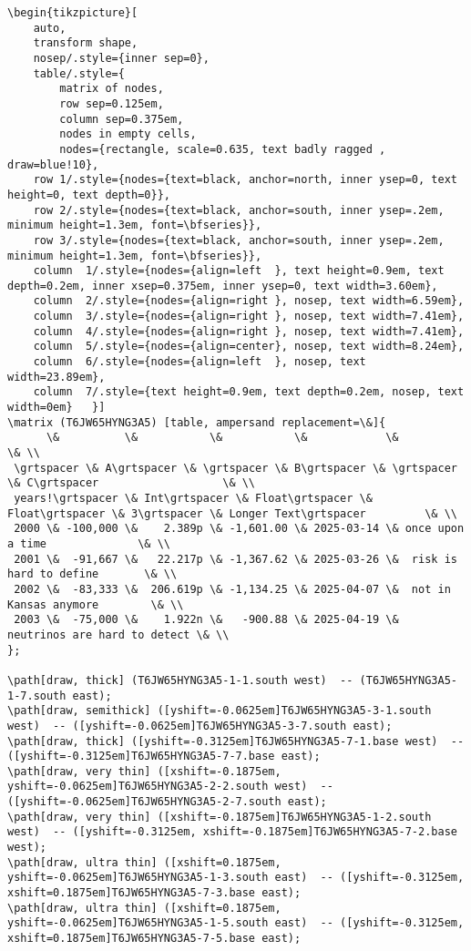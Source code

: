 \documentclass[
  11pt,
  a4paper,
  DIV=11,
  numbers=noendperiod]{scrartcl}
\newcommand{\grtspacer}{\vphantom{lp}}
\begin{document}
\begin{verbatim}
\begin{tikzpicture}[
    auto,
    transform shape,
    nosep/.style={inner sep=0},
    table/.style={
        matrix of nodes,
        row sep=0.125em,
        column sep=0.375em,
        nodes in empty cells,
        nodes={rectangle, scale=0.635, text badly ragged , draw=blue!10},
    row 1/.style={nodes={text=black, anchor=north, inner ysep=0, text height=0, text depth=0}},
    row 2/.style={nodes={text=black, anchor=south, inner ysep=.2em, minimum height=1.3em, font=\bfseries}},
    row 3/.style={nodes={text=black, anchor=south, inner ysep=.2em, minimum height=1.3em, font=\bfseries}},
    column  1/.style={nodes={align=left  }, text height=0.9em, text depth=0.2em, inner xsep=0.375em, inner ysep=0, text width=3.60em},
    column  2/.style={nodes={align=right }, nosep, text width=6.59em},
    column  3/.style={nodes={align=right }, nosep, text width=7.41em},
    column  4/.style={nodes={align=right }, nosep, text width=7.41em},
    column  5/.style={nodes={align=center}, nosep, text width=8.24em},
    column  6/.style={nodes={align=left  }, nosep, text width=23.89em},
    column  7/.style={text height=0.9em, text depth=0.2em, nosep, text width=0em}   }]
\matrix (T6JW65HYNG3A5) [table, ampersand replacement=\&]{
      \&          \&           \&           \&            \&                               \& \\
 \grtspacer \& A\grtspacer \& \grtspacer \& B\grtspacer \& \grtspacer \& C\grtspacer                   \& \\
 years!\grtspacer \& Int\grtspacer \& Float\grtspacer \& Float\grtspacer \& 3\grtspacer \& Longer Text\grtspacer         \& \\
 2000 \& -100,000 \&    2.389p \& -1,601.00 \& 2025-03-14 \& once upon a time              \& \\
 2001 \&  -91,667 \&   22.217p \& -1,367.62 \& 2025-03-26 \&  risk is hard to define       \& \\
 2002 \&  -83,333 \&  206.619p \& -1,134.25 \& 2025-04-07 \&  not in Kansas anymore        \& \\
 2003 \&  -75,000 \&    1.922n \&   -900.88 \& 2025-04-19 \&  neutrinos are hard to detect \& \\
};

\path[draw, thick] (T6JW65HYNG3A5-1-1.south west)  -- (T6JW65HYNG3A5-1-7.south east);
\path[draw, semithick] ([yshift=-0.0625em]T6JW65HYNG3A5-3-1.south west)  -- ([yshift=-0.0625em]T6JW65HYNG3A5-3-7.south east);
\path[draw, thick] ([yshift=-0.3125em]T6JW65HYNG3A5-7-1.base west)  -- ([yshift=-0.3125em]T6JW65HYNG3A5-7-7.base east);
\path[draw, very thin] ([xshift=-0.1875em, yshift=-0.0625em]T6JW65HYNG3A5-2-2.south west)  -- ([yshift=-0.0625em]T6JW65HYNG3A5-2-7.south east);
\path[draw, very thin] ([xshift=-0.1875em]T6JW65HYNG3A5-1-2.south west)  -- ([yshift=-0.3125em, xshift=-0.1875em]T6JW65HYNG3A5-7-2.base west);
\path[draw, ultra thin] ([xshift=0.1875em, yshift=-0.0625em]T6JW65HYNG3A5-1-3.south east)  -- ([yshift=-0.3125em, xshift=0.1875em]T6JW65HYNG3A5-7-3.base east);
\path[draw, ultra thin] ([xshift=0.1875em, yshift=-0.0625em]T6JW65HYNG3A5-1-5.south east)  -- ([yshift=-0.3125em, xshift=0.1875em]T6JW65HYNG3A5-7-5.base east);




\end{verbatim}
\end{document}
